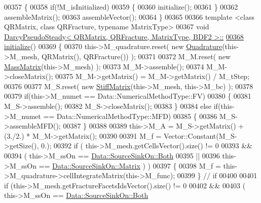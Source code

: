 \begin{DoxyCode}
00357 \{
00358     \textcolor{keywordflow}{if}(!M\_isInitialized)
00359     \{
00360         initialize();
00361     \}
00362     assembleMatrix();
00363     assembleVector();
00364 \}
00365 
00366 \textcolor{keyword}{template} <\textcolor{keyword}{class} QRMatrix, \textcolor{keyword}{class} QRFracture, \textcolor{keyword}{typename} MatrixType>
00367 \textcolor{keywordtype}{void} \hyperlink{classFVCode3D_1_1DarcyPseudoSteady}{DarcyPseudoSteady< QRMatrix, QRFracture, MatrixType, BDF2 >::}
\hypertarget{DarcyPseudoSteady_8hpp_source.tex_l00368}{}\hyperlink{classFVCode3D_1_1DarcyPseudoSteady_3_01QRMatrix_00_01QRFracture_00_01MatrixType_00_01BDF2_01_4_a7e0e4eeb55c7fce3f1968d29a430152f}{00368} \hyperlink{classFVCode3D_1_1DarcyPseudoSteady}{initialize}()
00369 \{
00370     this->M\_quadrature.reset( \textcolor{keyword}{new} \hyperlink{classFVCode3D_1_1Quadrature}{Quadrature}(this->M\_mesh, QRMatrix(), QRFracture()) );
00371 
00372     M\_M.reset( \textcolor{keyword}{new} \hyperlink{classFVCode3D_1_1MassMatrix}{MassMatrix}(this->M\_mesh) );
00373     M\_M->assemble();
00374     M\_M->closeMatrix();
00375     M\_M->getMatrix() = M\_M->getMatrix() / M\_tStep;
00376 
00377     M\_S.reset( \textcolor{keyword}{new} \hyperlink{classFVCode3D_1_1StiffMatrix}{StiffMatrix}(this->M\_mesh, this->M\_bc) );
00378 
00379     \textcolor{keywordflow}{if}(this->M\_numet == Data::NumericalMethodType::FV)
00380     \{
00381         M\_S->assemble();
00382         M\_S->closeMatrix();
00383     \}
00384     \textcolor{keywordflow}{else} \textcolor{keywordflow}{if}(this->M\_numet == Data::NumericalMethodType::MFD)
00385     \{
00386         M\_S->assembleMFD();
00387     \}
00388 
00389     this->M\_A = M\_S->getMatrix() + (3./2.) * M\_M->getMatrix();
00390 
00391     M\_f = Vector::Constant(M\_S->getSize(), 0.);
00392     \textcolor{keywordflow}{if} ( this->M\_mesh.getCellsVector().size() != 0
00393             &&
00394             ( this->M\_ssOn == \hyperlink{classFVCode3D_1_1Data_a4d66e2e205b350cb240820540339e1a3a130c5b3473c57faa76e2a1c54e26f88e}{Data::SourceSinkOn::Both}
00395                 ||
00396               this->M\_ssOn == \hyperlink{classFVCode3D_1_1Data_a4d66e2e205b350cb240820540339e1a3af53df0293e169f562bc1d9a20e1d2589}{Data::SourceSinkOn::Matrix} ) )
00397     \{
00398         M\_f = this->M\_quadrature->cellIntegrateMatrix(this->M\_func);
00399     \} \textcolor{comment}{// if}
00400 
00401     \textcolor{keywordflow}{if} (this->M\_mesh.getFractureFacetsIdsVector().size() != 0
00402             &&
00403             ( this->M\_ssOn == \hyperlink{classFVCode3D_1_1Data_a4d66e2e205b350cb240820540339e1a3a130c5b3473c57faa76e2a1c54e26f88e}{Data::SourceSinkOn::Both}

\end{DoxyCode}
